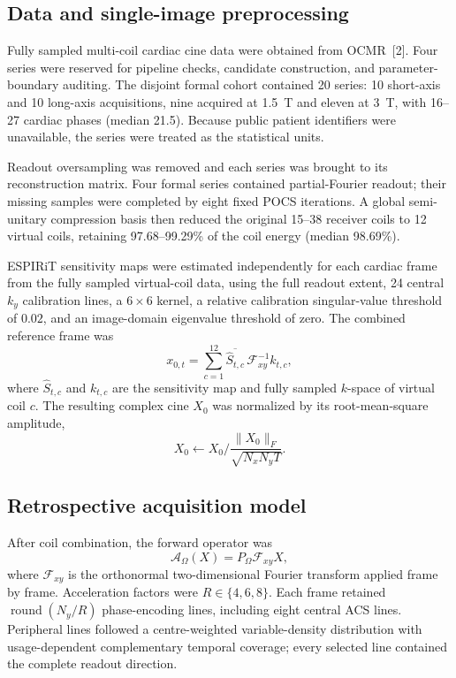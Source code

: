 \subsection{Data and single-image preprocessing}
\label{sec:data_preprocessing}

Fully sampled multi-coil cardiac cine data were obtained from OCMR~[2]. Four series were reserved for pipeline checks, candidate construction, and parameter-boundary auditing. The disjoint formal cohort contained 20 series: 10 short-axis and 10 long-axis acquisitions, nine acquired at 1.5~T and eleven at 3~T, with 16--27 cardiac phases (median 21.5). Because public patient identifiers were unavailable, the series were treated as the statistical units.

Readout oversampling was removed and each series was brought to its reconstruction matrix. Four formal series contained partial-Fourier readout; their missing samples were completed by eight fixed POCS iterations. A global semi-unitary compression basis then reduced the original 15--38 receiver coils to 12 virtual coils, retaining 97.68--99.29\% of the coil energy (median 98.69\%).

ESPIRiT sensitivity maps were estimated independently for each cardiac frame from the fully sampled virtual-coil data, using the full readout extent, 24 central $k_y$ calibration lines, a $6\times6$ kernel, a relative calibration singular-value threshold of $0.02$, and an image-domain eigenvalue threshold of zero. The combined reference frame was
\begin{equation}
  x_{0,t}=\sum_{c=1}^{12}\overline{\widehat S_{t,c}}\,
  \mathcal F^{-1}_{xy}k_{t,c},
  \label{eq:coil_combination}
\end{equation}
where $\widehat S_{t,c}$ and $k_{t,c}$ are the sensitivity map and fully sampled $k$-space of virtual coil $c$. The resulting complex cine $X_0$ was normalized by its root-mean-square amplitude,
\begin{equation}
  X_0\leftarrow X_0\bigg/
  \frac{\lVert X_0\rVert_F}{\sqrt{N_xN_yT}}.
  \label{eq:rms_normalization}
\end{equation}

\subsection{Retrospective acquisition model}
\label{sec:acquisition_model}

After coil combination, the forward operator was
\begin{equation}
  \mathcal A_{\Omega}(X)=P_{\Omega}\mathcal F_{xy}X,
  \label{eq:single_image_forward}
\end{equation}
where $\mathcal F_{xy}$ is the orthonormal two-dimensional Fourier transform applied frame by frame. Acceleration factors were $R\in\{4,6,8\}$. Each frame retained $\operatorname{round}(N_y/R)$ phase-encoding lines, including eight central ACS lines. Peripheral lines followed a centre-weighted variable-density distribution with usage-dependent complementary temporal coverage; every selected line contained the complete readout direction.

